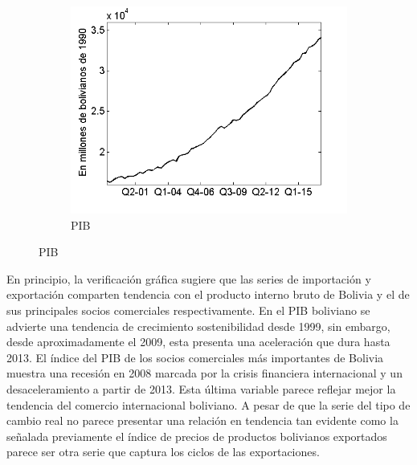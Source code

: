 \documentclass[12pt,letterpaper]{article}
\begin{document}
\begin{figure}
\begin{subfigure}[b]{0.4\textwidth}
        \includegraphics[width=\textwidth]{4pib}
        \caption{PIB}
        \label{4pib}
    \end{subfigure}
\end{figure}

En principio, la verificación gráfica sugiere que las series de importación y exportación comparten tendencia con el producto interno bruto de Bolivia y el de sus principales socios comerciales respectivamente. En el PIB boliviano se advierte una tendencia de crecimiento sostenibilidad desde 1999, sin embargo, desde aproximadamente el 2009, esta presenta una aceleración que dura hasta 2013. El índice del PIB de los socios comerciales más importantes de Bolivia muestra una recesión en 2008 marcada por la crisis financiera internacional y un desaceleramiento a partir de 2013. Esta última variable parece reflejar mejor la tendencia del comercio internacional boliviano. A pesar de que la serie del tipo de cambio real no parece presentar una relación en tendencia tan evidente como la señalada previamente el índice de precios de productos bolivianos exportados parece ser otra serie que captura los ciclos de las exportaciones.
\end{document}
